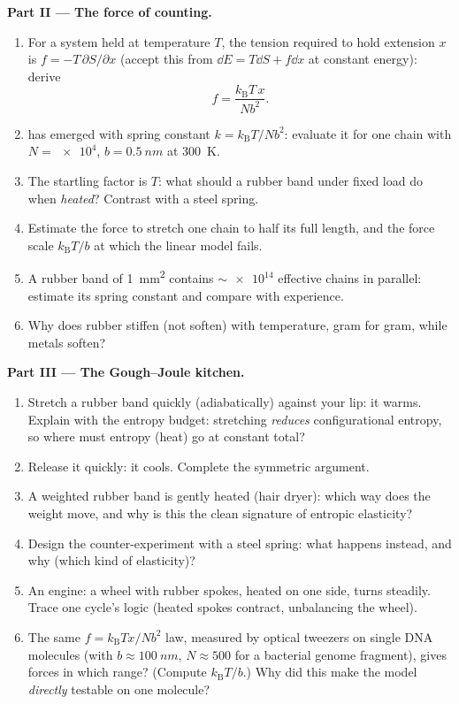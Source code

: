 \begin{problem}
\medskip\noindent\textbf{Part II --- The force of counting.}
\begin{enumerate}[resume]
  \item For a system held at temperature $T$, the tension required
        to hold extension $x$ is $f = -T\,\partial S/\partial x$
        (accept this from $\dd E = T\dd S + f\dd x$ at constant
        energy): derive
        \[
        f = \frac{k_{\text{B}}T\,x}{Nb^2} .
        \]
  \item {} has emerged with spring constant $k =
        k_{\text{B}}T/Nb^2$: evaluate it for one chain with $N =
        \num{e4}$, $b = \qty{0.5}{nm}$ at \qty{300}{K}.
  \item The startling factor is $T$: what should a rubber band
        under fixed load do when \emph{heated}? Contrast with a
        steel spring.
  \item Estimate the force to stretch one chain to half its full
        length, and the force scale $k_{\text{B}}T/b$ at which the
        linear model fails.
  \item A rubber band of  \qty{1}{mm^2} contains
        $\sim\num{e14}$ effective chains in parallel: estimate its
        spring constant and compare with experience.
  \item Why does rubber stiffen (not soften) with temperature,
        gram for gram, while metals soften?
\end{enumerate}

\medskip\noindent\textbf{Part III --- The Gough--Joule kitchen.}
\begin{enumerate}[resume]
  \item Stretch a rubber band quickly (adiabatically) against your
        lip: it warms. Explain with the entropy budget: stretching
        \emph{reduces} configurational entropy, so where must
        entropy (heat) go at constant total?
  \item Release it quickly: it cools. Complete the symmetric
        argument.
  \item A weighted rubber band is gently heated (hair dryer): which
        way does the weight move, and why is this the clean
        signature of entropic elasticity?
  \item Design the counter-experiment with a steel spring: what
        happens instead, and why (which kind of elasticity)?
  \item An engine: a wheel with rubber spokes, heated on one side,
        turns steadily. Trace one cycle's logic (heated spokes
        contract, unbalancing the wheel).
  \item The same $f = k_{\text{B}}Tx/Nb^2$ law, measured by
        optical tweezers on single DNA molecules (with $b \approx
        \qty{100}{nm}$, $N \approx 500$ for a bacterial genome
        fragment), gives forces in which range? (Compute
        $k_{\text{B}}T/b$.) Why did this make the model
        \emph{directly} testable on one molecule?
\end{enumerate}


\end{problem}
